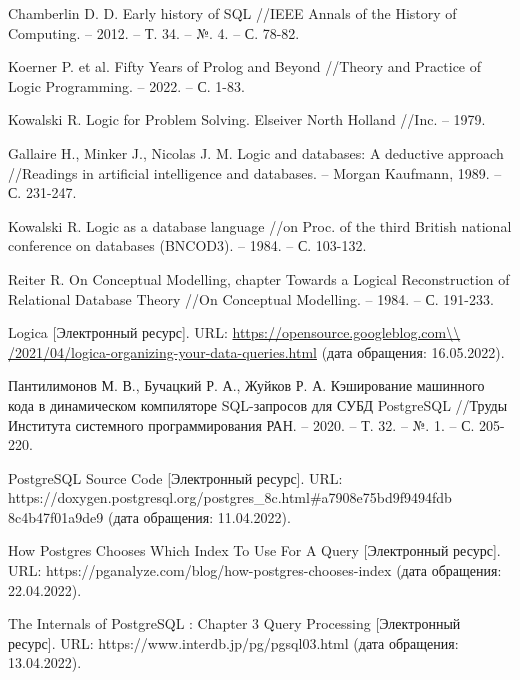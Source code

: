 \renewcommand\bibname{СПИСОК ИСПОЛЬЗОВАННЫХ ИСТОЧНИКОВ}
\begin{thebibliography}{3}
	\makeatletter
	\def\@biblabel#1{#1. }
	
	Chamberlin D. D. Early history of SQL //IEEE Annals of the History of Computing. – 2012. – Т. 34. – №. 4. – С. 78-82.
	
	Koerner P. et al. Fifty Years of Prolog and Beyond //Theory and Practice of Logic Programming. – 2022. – С. 1-83.
	
	Kowalski R. Logic for Problem Solving. Elseiver North Holland //Inc. – 1979.
	
	Gallaire H., Minker J., Nicolas J. M. Logic and databases: A deductive approach //Readings in artificial intelligence and databases. – Morgan Kaufmann, 1989. – С. 231-247.
	
	Kowalski R. Logic as a database language //on Proc. of the third British national conference on databases (BNCOD3). – 1984. – С. 103-132.
	
	Reiter R. On Conceptual Modelling, chapter Towards a Logical Reconstruction of Relational Database Theory //On Conceptual Modelling. – 1984. – С. 191-233.
	
	Logica [Электронный ресурс]. URL: \url{https://opensource.googleblog.com\\ /2021/04/logica-organizing-your-data-queries.html} (дата обращения: 16.05.2022).	
	
	Пантилимонов М. В., Бучацкий Р. А., Жуйков Р. А. Кэширование машинного кода в динамическом компиляторе SQL-запросов для СУБД PostgreSQL //Труды Института системного программирования РАН. – 2020. – Т. 32. – №. 1. – С. 205-220.
	
	PostgreSQL Source Code [Электронный ресурс]. URL: https://doxygen.postgresql.org/postgres\_8c.html\#a7908e75bd9f9494fdb
	8c4b47f01a9de9 (дата обращения: 11.04.2022).
	
	How Postgres Chooses Which Index To Use For A Query [Электронный ресурс]. URL: https://pganalyze.com/blog/how-postgres-chooses-index (дата обращения: 22.04.2022).
	
	The Internals of PostgreSQL : Chapter 3 Query Processing [Электронный ресурс]. URL: https://www.interdb.jp/pg/pgsql03.html (дата обращения: 13.04.2022).
	

\end{thebibliography}
